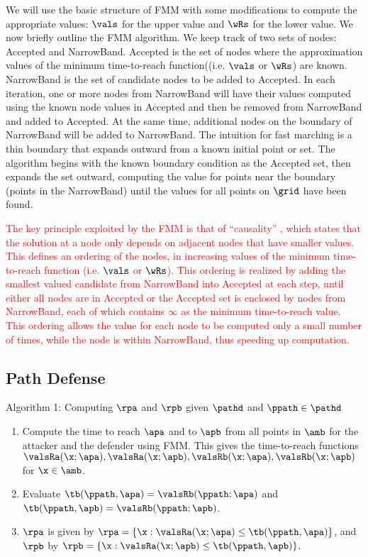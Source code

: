 We will use the basic structure of FMM with some modifications to compute the appropriate values: $\vals$ for the upper value and $\wRs$ for the lower value.
We now briefly outline the FMM algorithm.
We keep track of two sets of nodes: Accepted and NarrowBand. 
Accepted is the set of nodes where the approximation values of the minimum time-to-reach function((i.e. $\vals$ or $\wRs$) are known. 
NarrowBand is the set of candidate nodes to be added to Accepted.
 In each iteration, one or more nodes from NarrowBand will have their values computed using the known node values in Accepted and then be removed from NarrowBand and added to Accepted.
 At the same time, additional nodes on the boundary of NarrowBand will be added to NarrowBand.
The intuition for fast marching is a thin boundary that expands outward from a known initial point or set.
The algorithm begins with the known boundary condition as the Accepted set, then expands the set outward, computing the value for points near the boundary (points in the NarrowBand) until the values for all points on $\grid$ have been found.

\textcolor{red}{The key principle exploited by the FMM is that of ``causality'' \cite{SethSIAM}, which states that the solution at a node only depends on adjacent nodes that have smaller values.
This defines an ordering of the nodes, in increasing values of the minimum time-to-reach function (i.e. $\vals$ or $\wRs$). 
This ordering is realized by adding the smallest valued candidate from NarrowBand into Accepted at each step, until either all nodes are in Accepted or the Accepted set is enclosed by nodes from NarrowBand, each of which contains $\infty$ as the minimum time-to-reach value.
This ordering allows the value for each node to be computed only a small number of times, while the node is within NarrowBand, thus speeding up computation.}

\subsection{Path Defense}
Algorithm 1: Computing $\rpa$ and $\rpb$ given $\pathd$ and $\ppath\in\pathd$
\begin{enumerate}
\item Compute the time to reach $\apa$ and to $\apb$ from all points in $\amb$ for the attacker and the defender using FMM. This gives the time-to-reach functions $\valsRa(\x;\apa), \valsRa(\x;\apb), \valsRb(\x;\apa), \valsRb(\x;\apb)$ for $\x\in\amb$.
\item Evaluate $\tb(\ppath,\apa) = \valsRb(\ppath;\apa)$ and $\tb(\ppath,\apb) = \valsRb(\ppath;\apb)$.
\item $\rpa$ is given by $\rpa = \{\x: \valsRa(\x;\apa) \le \tb(\ppath,\apa)\}$, and $\rpb$ by $\rpb = \{\x: \valsRa(\x;\apb) \le \tb(\ppath,\apb)\}$.
\end{enumerate}


